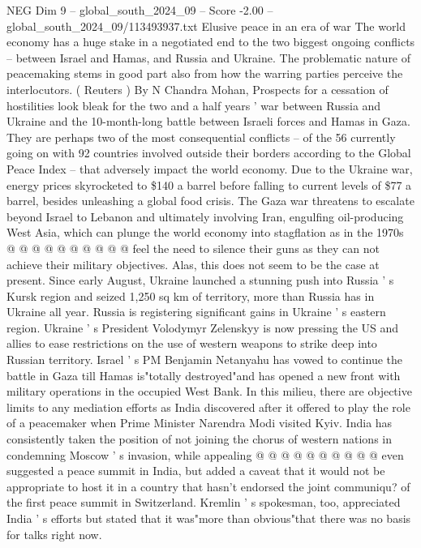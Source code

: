 \begin{textsample}{NEG Dim 9 – global\_south\_2024\_09 – Score -2.00 – global\_south\_2024\_09/113493937.txt}  \label{ex:f9_neg_196}
Elusive peace in an era of war The world economy has a huge stake in a negotiated end to the two biggest ongoing conflicts -- between Israel and Hamas, and Russia and Ukraine.
The problematic nature of peacemaking stems in good part also from how the warring parties perceive the interlocutors. ( Reuters ) By N Chandra Mohan, Prospects for a cessation of hostilities look bleak for the two and a half years ' war between Russia and Ukraine and the 10-month-long battle between Israeli forces and Hamas in Gaza.
They are perhaps two of the most consequential conflicts -- of the 56 currently going on with 92 countries involved outside their borders according to the Global Peace Index -- that adversely impact the world economy.
Due to the Ukraine war, energy prices skyrocketed to \$140 a barrel before falling to current levels of \$77 a barrel, besides unleashing a global food crisis.
The Gaza war threatens to escalate beyond Israel to Lebanon and ultimately involving Iran, engulfing oil-producing West Asia, which can plunge the world economy into stagflation as in the 1970s @ @ @ @ @ @ @ @ @ @ feel the need to silence their guns as they can not achieve their military objectives.
Alas, this does not seem to be the case at present.
Since early August, Ukraine launched a stunning push into Russia ' s Kursk region and seized 1,250 sq km of territory, more than Russia has in Ukraine all year.
Russia is registering significant gains in Ukraine ' s eastern region.
Ukraine ' s President Volodymyr Zelenskyy is now pressing the US and allies to ease restrictions on the use of western weapons to strike deep into Russian territory.
Israel ' s PM Benjamin Netanyahu has vowed to continue the battle in Gaza till Hamas is"totally destroyed"and has opened a new front with military operations in the occupied West Bank.
In this milieu, there are objective limits to any mediation efforts as India discovered after it offered to play the role of a peacemaker when Prime Minister Narendra Modi visited Kyiv.
India has consistently taken the position of not joining the chorus of western nations in condemning Moscow ' s invasion, while appealing @ @ @ @ @ @ @ @ @ @ even suggested a peace summit in India, but added a caveat that it would not be appropriate to host it in a country that hasn't endorsed the joint communiqu? of the first peace summit in Switzerland.
Kremlin ' s spokesman, too, appreciated India ' s efforts but stated that it was"more than obvious"that there was no basis for talks right now.

\end{textsample}
